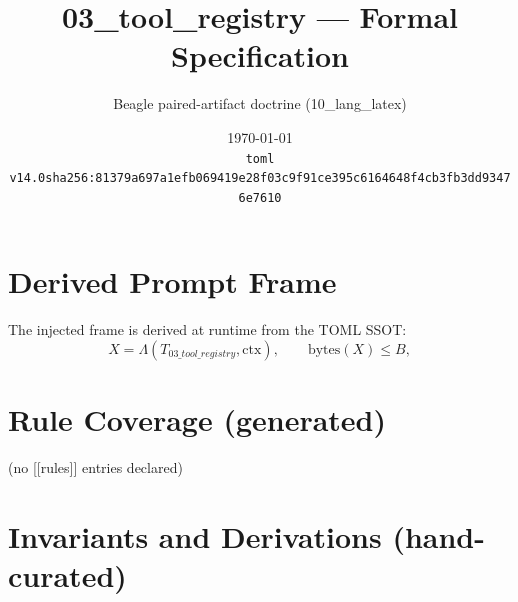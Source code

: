 \documentclass[11pt]{article}
\title{03\_tool\_registry --- Formal Specification}
\author{Beagle paired-artifact doctrine (10\_lang\_latex)}
\date{\today\\ \texttt{toml v14.0\quad sha256:81379a697a1efb069419e28f03c9f91ce395c6164648f4cb3fb3dd93476e7610}}
\begin{document}
\maketitle

\section{Derived Prompt Frame}
The injected frame is derived at runtime from the TOML SSOT:
\begin{equation}
  X = \Lambda(T_{03\_tool\_registry}, \mathrm{ctx}), \qquad \mathrm{bytes}(X) \le B,
  \label{lbl:derive-frame}
\end{equation}

\section{Rule Coverage (generated)}
(no [[rules]] entries declared)

\section{Invariants and Derivations (hand-curated)}
\end{document}
